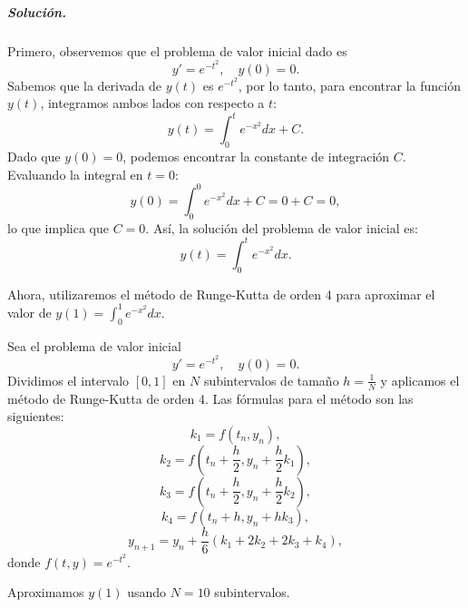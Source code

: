 \documentclass[12pt,letterpaper,oneside]{article}
\begin{document}
\subparagraph*{Solución.}
Primero, observemos que el problema de valor inicial dado es
\[
y' = e^{-t^2}, \quad y(0) = 0.
\]
Sabemos que la derivada de \(y(t)\) es \(e^{-t^2}\), por lo tanto, para encontrar la función \(y(t)\), integramos ambos lados con respecto a \(t\):
\[
y(t) = \int_0^t e^{-x^2} dx + C.
\]
Dado que \(y(0) = 0\), podemos encontrar la constante de integración \(C\). Evaluando la integral en \(t = 0\):
\[
y(0) = \int_0^0 e^{-x^2} dx + C = 0 + C = 0,
\]
lo que implica que \(C = 0\). Así, la solución del problema de valor inicial es:
\[
y(t) = \int_0^t e^{-x^2} dx.
\]

Ahora, utilizaremos el método de Runge-Kutta de orden 4 para aproximar el valor de \(y(1) = \int_0^1 e^{-x^2} dx\).

Sea el problema de valor inicial
\[
y' = e^{-t^2}, \quad y(0) = 0.
\]
Dividimos el intervalo \([0,1]\) en \(N\) subintervalos de tamaño \(h = \frac{1}{N}\) y aplicamos el método de Runge-Kutta de orden 4. Las fórmulas para el método son las siguientes:
\[
k_1 = f(t_n, y_n),
\]
\[
k_2 = f\left(t_n + \frac{h}{2}, y_n + \frac{h}{2} k_1\right),
\]
\[
k_3 = f\left(t_n + \frac{h}{2}, y_n + \frac{h}{2} k_2\right),
\]
\[
k_4 = f\left(t_n + h, y_n + h k_3\right),
\]
\[
y_{n+1} = y_n + \frac{h}{6} (k_1 + 2k_2 + 2k_3 + k_4),
\]
donde \(f(t, y) = e^{-t^2}\).

Aproximamos \(y(1)\) usando \(N = 10\) subintervalos.
\end{document}
